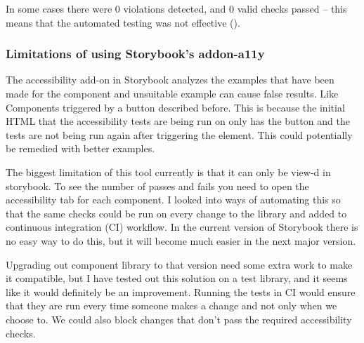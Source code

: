\documentclass{master_thesis}
\begin{document}
In some cases there were 0 violations detected, and 0 valid checks passed – this means that the automated testing was not effective ().

\subsubsection{Limitations of using Storybook's addon-a11y}

The accessibility add-on in Storybook analyzes the examples that have been made for the component and unsuitable example can cause false results. Like Components triggered by a button described before. This is because the initial HTML that the accessibility tests are being run on only has the button and the tests are not being run again after triggering the element. This could potentially be remedied with better examples.

The biggest limitation of this tool currently is that it can only be view-d in storybook. To see the number of passes and fails you need to open the accessibility tab for each component. I looked into ways of automating this so that the same checks could be run on every change to the library and added to continuous integration (CI) workflow. In the current version of Storybook there is no easy way to do this, but it will become much easier in the next major version.

Upgrading out component library to that version need some extra work to make it compatible, but I have tested out this solution on a test library, and it seems like it would definitely be an improvement. Running the tests in CI would ensure that they are run every time someone makes a change and not only when we choose to. We could also block changes that don't pass the required accessibility checks.

\end{document}
